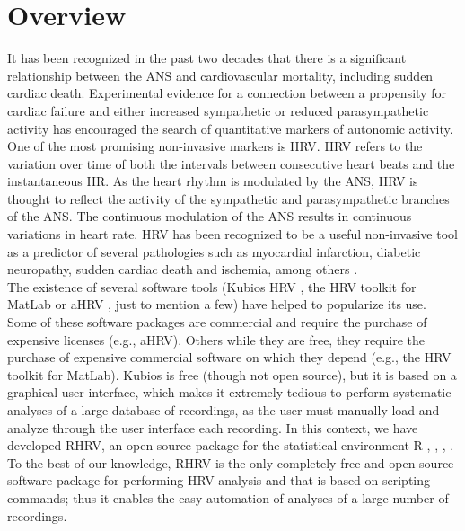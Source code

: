 
\chapter{Overview\label{ch:overview}}
It has been recognized in the past two decades that there is a significant relationship between the \gls{ANS}
and cardiovascular mortality, including sudden cardiac death. Experimental 
evidence for a connection between a propensity for cardiac failure and either increased sympathetic or
reduced parasympathetic activity has encouraged the search of quantitative markers of autonomic activity.\\

One of the most promising non-invasive markers is \gls{HRV}. \gls{HRV} refers to the variation over time
of both the intervals between consecutive heart beats and the instantaneous \gls{HR}. As the heart rhythm
is modulated by the \gls{ANS}, \gls{HRV} is thought
to reflect the activity of the sympathetic and parasympathetic branches of
the \gls{ANS}. The continuous modulation of the ANS results in continuous variations in heart rate. \gls{HRV} has been recognized
to be a useful non-invasive tool as a predictor of several pathologies such as myocardial infarction, diabetic neuropathy, sudden cardiac death
and ischemia, among others \cite{kautznerClinical}. \\

The existence of several software tools (Kubios HRV \cite%
{kubios}, the \gls{HRV} toolkit for MatLab \cite{matlab} or aHRV
\cite{ahrv}, just to mention a few) have helped to popularize its use. Some of these software packages are commercial and require the purchase of expensive licenses (e.g., aHRV). Others while they are free, they require the purchase of expensive commercial software on which they depend (e.g., the HRV toolkit for MatLab).  Kubios is free (though not open source), but it is based on a graphical user interface, which makes it extremely tedious to perform systematic analyses of a large database of recordings, as the user must manually load and analyze through the user interface each recording.  In this context, we have developed RHRV, an open-source package for the statistical environment R \cite{waveletBiosignals}, \cite{waveletArticle}, \cite{vilaRHRV}, \cite{vila2009r}. To the best of our knowledge, RHRV is the only completely free and open source software package for performing HRV analysis and that is based on scripting commands; thus it enables the easy automation of analyses of a large number of 
recordings. \\

